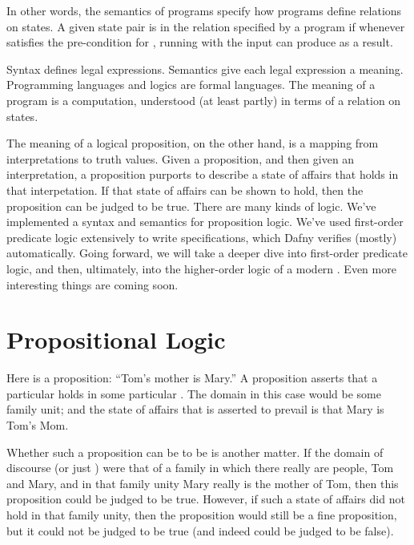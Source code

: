 \documentclass[letterpaper,10pt,english]{sphinxmanual}
\begin{document}
In other words, the semantics of programs specify how programs define
relations on states. A given state pair  is in the relation
specified by a program  if whenever  satisfies the pre-condition
for , running  with the input  can produce  as a result.

Syntax defines legal expressions. Semantics give each legal expression
a meaning. Programming languages and logics are formal languages. The
meaning of a program is a computation, understood (at least partly) in
terms of a relation on states.

The meaning of a logical proposition, on the other hand, is a mapping
from interpretations to truth values. Given a proposition, and then
given an interpretation, a proposition purports to describe a state of
affairs that holds in that interpetation. If that state of affairs can
be shown to hold, then the proposition can be judged to be true. There
are many kinds of logic. We’ve implemented a syntax and semantics for
proposition logic. We’ve used first-order predicate logic extensively
to write specifications, which Dafny verifies (mostly) automatically.
Going forward, we will take a deeper dive into first-order predicate
logic, and then, ultimately, into the higher-order logic of a modern
. Even more interesting things are coming soon.


\chapter{Propositional Logic}
\label{\detokenize{11-propositional-logic::doc}}\label{\detokenize{11-propositional-logic:propositional-logic}}
Here is a proposition: “Tom’s mother is Mary.” A proposition asserts
that a particular  holds in some particular . The domain in this case would be some family unit; and
the state of affairs that is asserted to prevail is that Mary is Tom’s
Mom.

Whether such a proposition can be  to be  is another
matter. If the domain of discourse (or just ) were that of a
family in which there really are people, Tom and Mary, and in that
family unity Mary really is the mother of Tom, then this proposition
could be judged to be true. However, if such a state of affairs did
not hold in that family unity, then the proposition would still be a
fine proposition, but it could not be judged to be true (and indeed
could be judged to be false).
\end{document}
